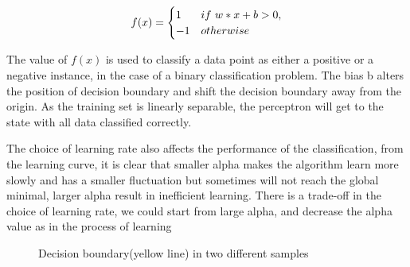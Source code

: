 \documentclass[10pt]{article}
\begin{document}
\begin{equation}
    \centering
     f(x)  =\begin{cases}1 & if \ w \ast x + b >0, \\-1 & otherwise\end{cases} 
    \centering
\end{equation}

The value of $f(x)$ is used to classify a data point as either a positive or a negative instance, in the case of a binary classification problem. The bias b alters the position of decision boundary and shift the decision boundary away from the origin. As the training set is linearly separable, the perceptron will get to the state with all data classified correctly. 

The choice of learning rate also affects the performance of the classification, from the learning curve, it is clear that smaller alpha makes the algorithm learn more slowly and has a smaller fluctuation but sometimes will not reach the global minimal, larger alpha result in inefficient learning. There is a trade-off in the choice of learning rate, we could start from large alpha, and decrease the alpha value as in the process of learning

\begin{figure} %
	\centering  %
	\vspace{-0.35cm} %
	\subfigtopskip=2pt %
	\subfigbottomskip=2pt %
	\subfigcapskip=-5pt %
	\quad %
	\caption{Decision boundary(yellow line) in two different samples}
\end{figure}
\end{document}
